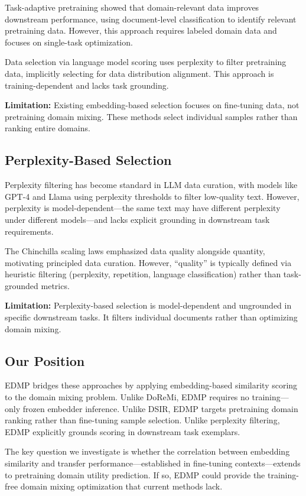 Task-adaptive pretraining \citep{gururangan2020dont} showed that domain-relevant data improves downstream performance, using document-level classification to identify relevant pretraining data. However, this approach requires labeled domain data and focuses on single-task optimization.

Data selection via language model scoring \citep{marion2023less} uses perplexity to filter pretraining data, implicitly selecting for data distribution alignment. This approach is training-dependent and lacks task grounding.

\textbf{Limitation:} Existing embedding-based selection focuses on fine-tuning data, not pretraining domain mixing. These methods select individual samples rather than ranking entire domains.

\subsection{Perplexity-Based Selection}

Perplexity filtering has become standard in LLM data curation, with models like GPT-4 and Llama using perplexity thresholds to filter low-quality text. However, perplexity is model-dependent---the same text may have different perplexity under different models---and lacks explicit grounding in downstream task requirements.

The Chinchilla scaling laws \citep{hoffmann2022training} emphasized data quality alongside quantity, motivating principled data curation. However, ``quality'' is typically defined via heuristic filtering (perplexity, repetition, language classification) rather than task-grounded metrics.

\textbf{Limitation:} Perplexity-based selection is model-dependent and ungrounded in specific downstream tasks. It filters individual documents rather than optimizing domain mixing.

\subsection{Our Position}

EDMP bridges these approaches by applying embedding-based similarity scoring to the domain mixing problem. Unlike DoReMi, EDMP requires no training---only frozen embedder inference. Unlike DSIR, EDMP targets pretraining domain ranking rather than fine-tuning sample selection. Unlike perplexity filtering, EDMP explicitly grounds scoring in downstream task exemplars.

The key question we investigate is whether the correlation between embedding similarity and transfer performance---established in fine-tuning contexts---extends to pretraining domain utility prediction. If so, EDMP could provide the training-free domain mixing optimization that current methods lack.

